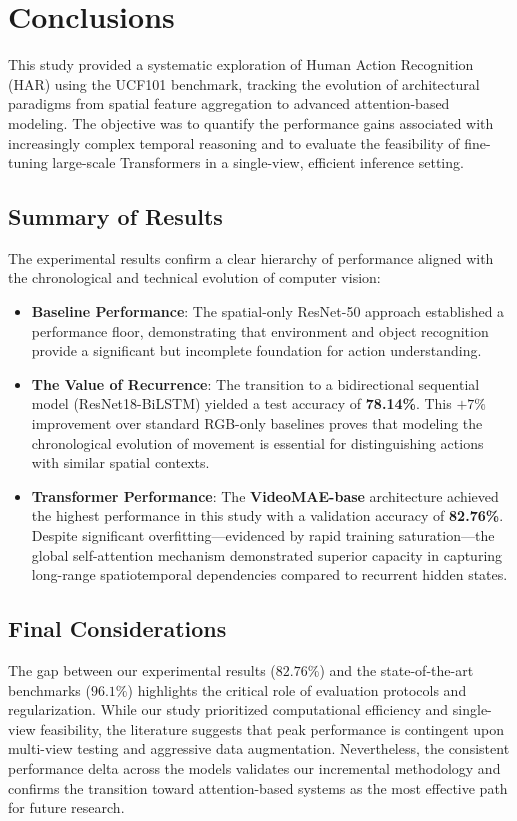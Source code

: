 \section{Conclusions}

This study provided a systematic exploration of Human Action Recognition (HAR) using the UCF101 benchmark, tracking the evolution of architectural paradigms from spatial feature aggregation to advanced attention-based modeling. The objective was to quantify the performance gains associated with increasingly complex temporal reasoning and to evaluate the feasibility of fine-tuning large-scale Transformers in a single-view, efficient inference setting.

\subsection{Summary of Results}
The experimental results confirm a clear hierarchy of performance aligned with the chronological and technical evolution of computer vision:
\begin{itemize}
    \item \textbf{Baseline Performance}: The spatial-only ResNet-50 approach established a performance floor, demonstrating that environment and object recognition provide a significant but incomplete foundation for action understanding.
    \item \textbf{The Value of Recurrence}: The transition to a bidirectional sequential model (ResNet18-BiLSTM) yielded a test accuracy of \textbf{78.14\%}. This $+7\%$ improvement over standard RGB-only baselines proves that modeling the chronological evolution of movement is essential for distinguishing actions with similar spatial contexts.
    \item \textbf{Transformer Performance}: The \textbf{VideoMAE-base} architecture achieved the highest performance in this study with a validation accuracy of \textbf{82.76\%}. Despite significant overfitting—evidenced by rapid training saturation—the global self-attention mechanism demonstrated superior capacity in capturing long-range spatiotemporal dependencies compared to recurrent hidden states.
\end{itemize}

\subsection{Final Considerations}
The gap between our experimental results ($82.76\%$) and the state-of-the-art benchmarks ($96.1\%$) highlights the critical role of evaluation protocols and regularization. While our study prioritized computational efficiency and single-view feasibility, the literature suggests that peak performance is contingent upon multi-view testing and aggressive data augmentation. Nevertheless, the consistent performance delta across the models validates our incremental methodology and confirms the transition toward attention-based systems as the most effective path for future research.